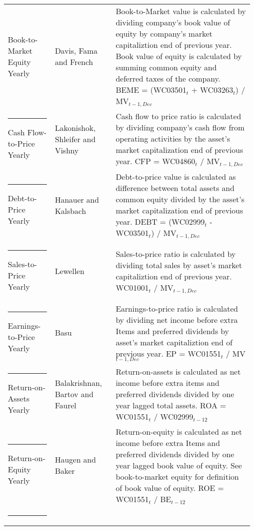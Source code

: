 \documentclass{article}
\begin{document}
{{\begin{xltabular}{\textwidth}{ >{\raggedright\arraybackslash}p{0.23\textwidth} >{\raggedright\arraybackslash}p{0.2\textwidth} X}
Book-to-Market Equity \newline Yearly & Davis, Fama and French \citeyear{Davis2000}	&  Book-to-Market value is calculated by dividing company's book value of equity by company's market capitaliztion end of previous year. Book value of equity is calculated by summing common equity and deferred taxes of the company. \newline BEME = (WC03501$_{t}$ + WC03263$_{t}$) /  MV$_{t-1, Dec}$\\ \rule{-1ex}{3ex}
Cash Flow-to-Price \newline Yearly	& Lakonishok, Shleifer and Vishny  \citeyear{Lakonishok1994} 	& Cash flow to price ratio is calculated by dividing company's cash flow from operating activities by the asset's market capitalization end of previous year. \newline CFP = WC04860$_{t}$ / MV$_{t-1, Dec}$\\ \rule{-1ex}{3ex}
Debt-to-Price \newline Yearly		& Hanauer and Kalsbach \citeyear{HANAUER2023}	& Debt-to-price value is calculated as difference between total assets and common equity divided by the asset's market capitalization end of previous year. \newline DEBT = (WC02999$_{t}$ - WC03501$_{t}$) / MV$_{t-1, Dec}$\\ \rule{-1ex}{3ex}
Sales-to-Price 	\newline Yearly		& Lewellen \citeyear{Lewellen2015}				& Sales-to-price ratio is calculated by dividing total sales by asset's market capitaliztion end of previous year. \newline WC01001$_{t}$ / MV$_{t-1, Dec}$ \\ \rule{-1ex}{3ex}
Earnings-to-Price \newline Yearly	& Basu \citeyear{Basu1977}					& Earnings-to-price ratio is calculated by dividing net income before extra Items and preferred dividends by asset's market capitaliztion end of previous year. \newline EP = WC01551$_{t}$ / MV$_{t-1, Dec}$ \\ \rule{-1ex}{3ex}
Return-on-Assets \newline Yearly	& Balakrishnan, Bartov and Faurel \citeyear{BALAKRISHNAN2010}	& Return-on-assets is calculated as net income before extra items and preferred dividends divided by one year lagged total assets. \newline ROA = WC01551$_{t}$ / WC02999$_{t-12}$ \\ \rule{-1ex}{3ex}
Return-on-Equity \newline Yearly	& Haugen and Baker \citeyear{HAUGEN1996}		& Return-on-equity is calculated as net income before extra Items and preferred dividends divided by one year lagged book value of equity. See book-to-market equity for definition of book value of equity. \newline ROE = WC01551$_{t}$ / BE$_{t-12}$ \\ \rule{-1ex}{3ex}

\end{xltabular}}}
\end{document}
